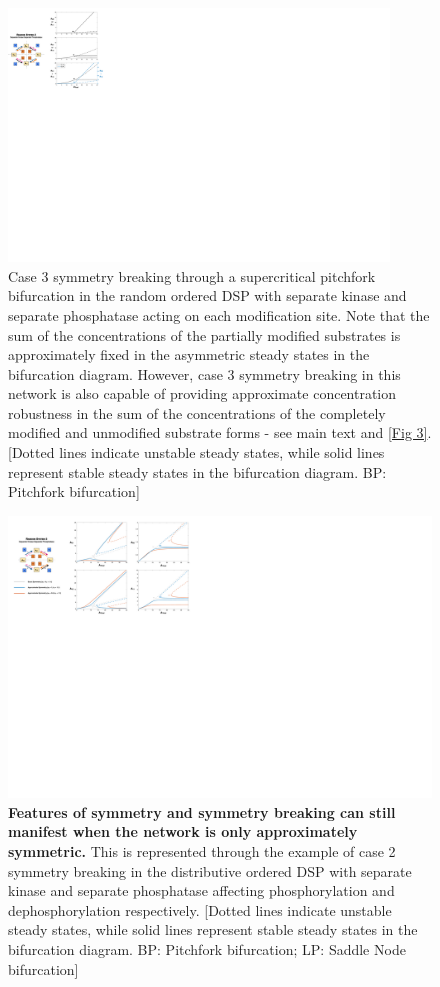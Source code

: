 \documentclass[9pt,lineno]{elife}
\begin{document}
\clearpage
\begin{figure}[ht!]
    \centering
    \includegraphics[width = 0.9\textwidth, keepaspectratio]{FigS04.pdf}
    \caption{Case 3 symmetry breaking through a supercritical pitchfork bifurcation in the random ordered DSP with separate kinase and separate phosphatase acting on each modification site. Note that the sum of the concentrations of the partially modified substrates is approximately fixed in the asymmetric steady states in the bifurcation diagram. However, case 3 symmetry breaking in this network is also capable of providing approximate concentration robustness in the sum of the concentrations of the completely modified and unmodified substrate forms - see main text and \cref{Fig 3}. [Dotted lines indicate unstable steady states, while solid lines represent stable steady states in the bifurcation diagram. BP: Pitchfork bifurcation]}
    \label{Fig S4}
\end{figure}

\clearpage
\begin{figure}[ht!]
    \centering
    \includegraphics[width = 0.9\linewidth, keepaspectratio]{FigS05.pdf}
    \caption{\textbf{Features of symmetry and symmetry breaking can still manifest when the network is only approximately symmetric.} This is represented through the example of case 2 symmetry breaking in the distributive ordered DSP with separate kinase and separate phosphatase affecting phosphorylation and dephosphorylation respectively. [Dotted lines indicate unstable steady states, while solid lines represent stable steady states in the bifurcation diagram. BP: Pitchfork bifurcation; LP: Saddle Node bifurcation]}
    \label{Fig S5}
\end{figure}
\end{document}
